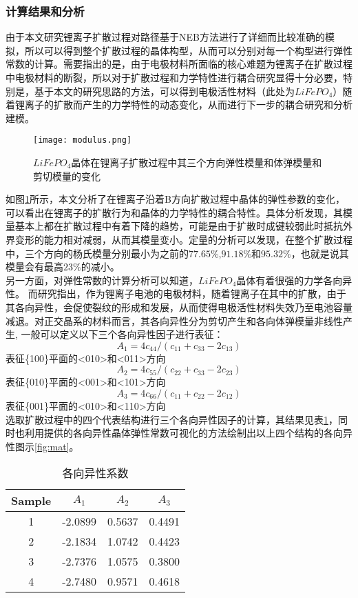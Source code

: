 \subsubsection{计算结果和分析}
由于本文研究锂离子扩散过程对路径基于NEB方法进行了详细而比较准确的模拟，所以可以得到整个扩散过程的晶体构型，从而可以分别对每一个构型进行弹性常数的计算。需要指出的是，由于电极材料所面临的核心难题为锂离子在扩散过程中电极材料的断裂，所以对于扩散过程和力学特性进行耦合研究显得十分必要，特别是，基于本文的研究思路的方法，可以得到电极活性材料（此处为$LiFePO_4$）随着锂离子的扩散而产生的力学特性的动态变化，从而进行下一步的耦合研究和分析建模。\\
\begin{figure}
	\centering   
	\texttt{[image: modulus.png]}
	\caption{$LiFePO_4$晶体在锂离子扩散过程中其三个方向弹性模量和体弹模量和剪切模量的变化} 
	\label{fig:modulus}
\end{figure}
\indent 如图\ref{fig:modulus}所示，本文分析了在锂离子沿着B方向扩散过程中晶体的弹性参数的变化，可以看出在锂离子的扩散行为和晶体的力学特性的耦合特性。具体分析发现，其模量基本上都在扩散过程中有着下降的趋势，可能是由于扩散时成键较弱此时抵抗外界变形的能力相对减弱，从而其模量变小。定量的分析可以发现，在整个扩散过程中，三个方向的杨氏模量分别最小为之前的$77.65\%$,$91.18\%$和$95.32\%$，也就是说其模量会有最高$23\%$的减小。\\
\indent 另一方面，对弹性常数的计算分析可以知道，$LiFePO_4$晶体有着很强的力学各向异性。 而研究指出，作为锂离子电池的电极材料，随着锂离子在其中的扩散，由于其各向异性，会促使裂纹的形成和发展\cite{Tvergaard1988Microcracking,Rice1992Dislocation}，从而使得电极活性材料失效乃至电池容量减退。对正交晶系的材料而言，其各向异性分为剪切产生和各向体弹模量非线性产生,
一般可以定义以下三个各向异性因子进行表征\cite{Ranganathan2008Universal,Ravindran1998Density}：
\begin{equation}
A_1 = 4c_{44}/(c_{11} + c_{33} -2c_{13})
\end{equation}
表征\{100\}平面的<010>和<011>方向
\begin{equation}
A_2 = 4c_{55}/(c_{22} + c_{33} -2c_{23})
\end{equation}
表征\{010\}平面的<001>和<101>方向
\begin{equation}
A_3 = 4c_{66}/(c_{11} + c_{22} -2c_{12})
\end{equation}
表征\{001\}平面的<010>和<110>方向\\
\indent 选取扩散过程中的四个代表结构进行三个各向异性因子的计算，其结果见表\ref{tab:A}，同时也利用\cite{jerkwin}提供的各向异性晶体弹性常数可视化的方法绘制出以上四个结构的各向异性图示\ref{fig:mat}。
\begin{table}[!htbp]
\centering
\caption{各向异性系数}\label{tab:A}%
\begin{tabular}{cccc}
\toprule
Sample & $A_1$ & $A_2$ & $A_3$\\
\midrule
1 & -2.0899 & 0.5637 & 0.4491\\
2 & -2.1834 & 1.0742 & 0.4423 \\
3 & -2.7376 & 1.0575 & 0.3800\\
4 & -2.7480 & 0.9571 & 0.4618\\
\bottomrule
\end{tabular}
\end{table}

